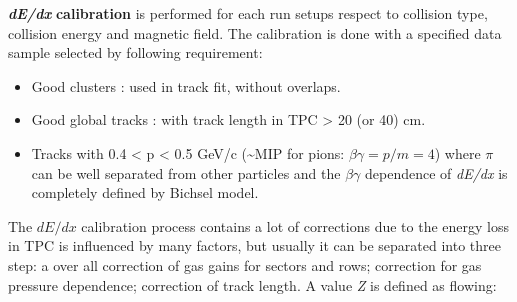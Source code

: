 \textbf{\emph{dE/dx}}\textbf{ calibration} is performed for each run
setups respect to collision type, collision energy and magnetic field.
The calibration is done with a specified data sample selected by following
requirement:
\begin{itemize}
\item Good clusters : used in track fit, without overlaps.
\item Good global tracks : with track length in TPC > 20 (or 40) cm.
\item Tracks with 0.4 < p < 0.5 GeV/c (\textasciitilde{}MIP for pions: $\beta\gamma=p/m=4$)
where $\pi$ can be well separated from other particles and the $\beta\gamma$
dependence of \emph{dE/dx }is completely defined by Bichsel model.
\end{itemize}
The $dE/dx$ calibration process contains a lot of corrections due
to the energy loss in TPC is influenced by many factors, but usually
it can be separated into three step: a over all correction of gas
gains for sectors and rows; correction for gas pressure dependence;
correction of track length. A value \emph{Z }is defined as flowing:

